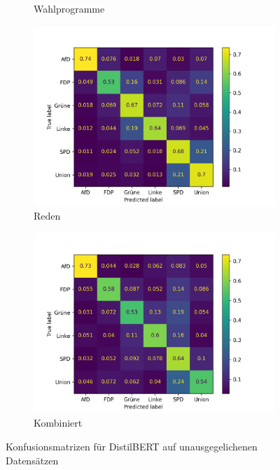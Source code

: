\begin{figure}[H]
\begin{subfigure}{0.49\textwidth}
      \caption{Wahlprogramme} \label{sfig:confusionMatrixBertManifestUnbalanced}
    \end{subfigure}
    \hfill
    \begin{subfigure}{0.49\textwidth}
      \includegraphics[width=\textwidth]{data/images/modeling/bert/none/speeches_confusion_matrix.png}
      \caption{Reden} \label{sfig:confusionMatrixBertSpeechesUnbalanced}
    \end{subfigure}
    \hfill
    \begin{subfigure}{0.49\textwidth}
      \includegraphics[width=\textwidth]{data/images/modeling/bert/none/all_confusion_matrix.png}
      \caption{Kombiniert} \label{sfig:confusionMatrixBertAllUnbalanced}
    \end{subfigure}
    \caption{Konfusionsmatrizen für DistilBERT auf unausgegelichenen Datensätzen} \label{fig:confusionMatrixDistilbertUnbalanced}
\end{figure}
